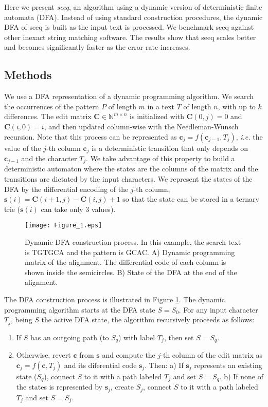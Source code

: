 \documentclass{bioinfo}
\begin{document}
Here we present \emph{seeq}, an algorithm using a dynamic version of
deterministic finite automata (DFA). Instead of using standard
construction procedures, the dynamic DFA of seeq is built as the input
text is processed. We benchmark seeq against other inexact string
matching software. The results show that seeq scales better and
becomes significantly faster as the error rate increases. 
\begin{methods}
\section{Methods}

We use a DFA representation of a dynamic programming algorithm.
We search the occurrences of the pattern $P$ of length $m$
in a text $T$ of length $n$, with up to $k$ differences.
The edit matrix $\mathbf{C} \in \mathbb{N}^{m\times n}$ is initialized
with $\mathbf{C}(0,j)=0$ and $\mathbf{C}(i,0) = i$, and then updated
column-wise with the Needleman-Wunsch recursion. Note that this process
can be represented as $\mathbf{c}_j=f(\mathbf{c}_{j-1},T_j)$,
\textit{i.e.} the value of the $j$-th column $\mathbf{c}_{j}$ is a
deterministic transition that only depends on $\mathbf{c}_{j-1}$ and the
character $T_j$. We take advantage of this property to build a
deterministic automaton where the states are the columns of the matrix
and the transitions are dictated by the input characters.
We represent the states of the DFA by the differential encoding
of the $j$-th column, $\mathbf{s}(i)=\mathbf{C}(i+1,j)-\mathbf{C}(i,j)+1$
so that the state can be stored in a ternary trie ($\mathbf{s}(i)$
can take only 3 values).

\begin{figure}[!tpb]
\centerline{\texttt{[image: Figure\_1.eps]}}
\caption{Dynamic DFA construction process. In this example, the search
text is TGTGCA and the pattern is GCAC.
A) Dynamic programming matrix of the alignment. The differential code
of each column is shown inside the semicircles. B) State of the DFA at
the end of the alignment.}\label{matrix}
\end{figure}

The DFA construction process is illustrated in Figure \ref{matrix}. The
dynamic programming algorithm starts at the DFA state
$S = S_0$. For any input character $T_j$, being $S$
the active DFA state, the algorithm recursively proceeds as follows:
\begin{enumerate}
\item If $S$ has an outgoing path (to $S_q$) with
label $T_j$, then set $S = S_q$.
\item Otherwise, revert $\mathbf{c}$ from $\mathbf{s}$ and compute
the $j$-th column of the edit matrix as $\mathbf{c}_j = f(\mathbf{c}, T_j)$ and
its diferential code $\mathbf{s}_j$. Then: a) If $\mathbf{s}_j$
represents an existing state ($S_q$), connect $S$ to it with a path
labeled $T_j$ and set $S = S_q$. b) If none of the states is
represented by $\mathbf{s}_j$, create $S_j$, connect $S$ to it with a
path labeled $T_j$ and set $S = S_j$.
\end{enumerate}


\end{methods}
\end{document}
